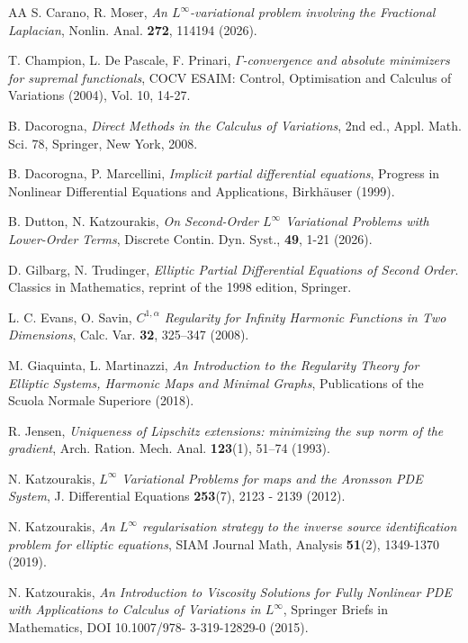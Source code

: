 \documentclass[a4paper,11pt]{article}
\numberwithin{equation}{section}
\theoremstyle{definition}
\begin{document}
\begin{thebibliography}{AA}
S. Carano, R. Moser, \emph{
An $L^\infty$-variational problem involving the Fractional Laplacian}, Nonlin. Anal. {\bf 272}, {114194} (2026).

 T. Champion, L. De Pascale, F. Prinari, \emph{$\Gamma$-convergence and absolute minimizers for supremal functionals}, COCV ESAIM: Control, Optimisation and Calculus of Variations (2004), Vol. 10, 14-27. 

B. Dacorogna, {\it Direct Methods in the Calculus of Variations}, 2nd ed., Appl. Math. Sci. 78, Springer, New York, 2008.

 B. Dacorogna, P. Marcellini, \emph{Implicit partial differential equations}, Progress in Nonlinear Differential Equations and Applications, Birkh\"auser (1999).

B. Dutton, N. Katzourakis, {\it On Second-Order $L^\infty$ Variational Problems with Lower-Order Terms}, Discrete Contin. Dyn. Syst., {\bf 49}, 1-21 (2026).

D. Gilbarg, N. Trudinger, {\it Elliptic Partial Differential Equations of Second Order}.
Classics in Mathematics, reprint of the 1998 edition, Springer.

L. C. Evans, O. Savin, {\it $C^{1,\alpha}$ Regularity for Infinity Harmonic Functions in Two
Dimensions}, Calc. Var. {\bf 32}, 325–347 (2008).

M. Giaquinta, L. Martinazzi, {\it An Introduction to the Regularity Theory for Elliptic Systems,
Harmonic Maps and Minimal Graphs}, Publications of the Scuola Normale Superiore (2018).

R. Jensen, {\it Uniqueness of Lipschitz extensions: minimizing the sup norm of the gradient}, Arch. Ration. Mech. Anal. {\bf 123}(1), 51–74 (1993).

N. Katzourakis, {\it $L^\infty$ Variational Problems for maps and the Aronsson PDE System}, J. Differential
Equations {\bf 253}(7), 2123 - 2139 (2012).

N. Katzourakis, {\it An $L^\infty$ regularisation strategy to the inverse source identification problem for elliptic equations}, SIAM Journal Math, Analysis {\bf 51}(2), 1349-1370 (2019).

N. Katzourakis, {\it An Introduction to Viscosity Solutions for Fully Nonlinear PDE with Applications
to Calculus of Variations in $L^\infty$}, Springer Briefs in Mathematics,  DOI 10.1007/978-
3-319-12829-0 (2015).


\end{thebibliography}
\end{document}
